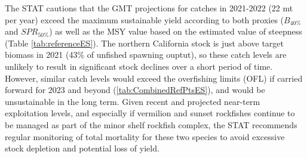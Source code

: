 \documentclass[11pt,
  english,
  a4paper,
]{article}
\begin{document}
The STAT cautions that the GMT projections for catches in 2021-2022 (22 mt per year) exceed the maximum sustainable yield according to both proxies ({\(B_{40\%}\)\leavevmode\tagmcend\tagstructend} and {\(SPR_{50\%}\)\leavevmode\tagmcend\tagstructend}) as well as the MSY value based on the estimated value of steepness (Table \ref{tab:referenceES}). The northern California stock is just above target biomass in 2021 (43\% of unfished spawning ouptut), so these catch levels are unlikely to result in significant stock declines over a short period of time. However, similar catch levels would exceed the overfishing limits (OFL) if carried forward for 2023 and beyond (\ref{tab:CombinedRefPtsES}), and would be unsustainable in the long term. Given recent and projected near-term exploitation levels, and especially if vermilion and sunset rockfishes continue to be managed as part of the minor shelf rockfish complex, the STAT recommends regular monitoring of total mortality for these two species to avoid excessive stock depletion and potential loss of yield.
\end{document}
